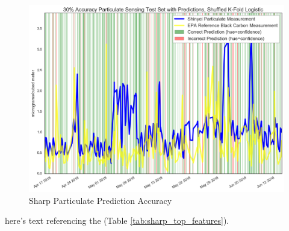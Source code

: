 \begin{figure}[htb]
 	\includegraphics[width=\textwidth]{figs/sharp_goals_30_logistic_predictions}               
 	 \caption{Sharp Particulate Prediction Accuracy}
  	\label{fig:sharp_30_logistic_predictions}
\end{figure}



here's text referencing the (Table \ref{tab:sharp_top_features}).

